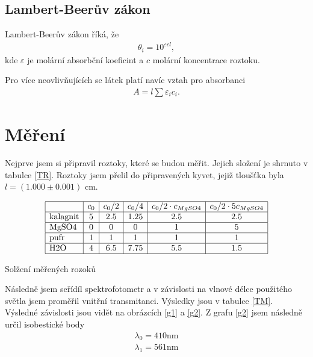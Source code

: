 \documentclass[a4paper,12pt]{article}
\begin{document}
\subsection{Lambert-Beerův zákon}
Lambert-Beerův zákon říká, že
\begin{eqnarray}
\theta_i=10^{\varepsilon cl},
\end{eqnarray}
kde $\varepsilon$ je molární absorbční koeficint a $c$ molární koncentrace roztoku.

Pro více neovlivňujících se látek platí navíc vztah pro absorbanci
\begin{eqnarray}
A=l\sum\varepsilon_ic_i.
\end{eqnarray}

\section{Měření}
Nejprve jsem si připravil roztoky, které se budou měřit. Jejich složení je shrnuto v tabulce \ref{TR}. Roztoky jsem přelil do připravených kyvet, jejiž tloušťka byla 
$l=(1.000 \pm 0.001)$ cm.

\begin{table}
$$
\begin{array}{|l|c|c|c|c|c|}
\hline
&   c_0&    c_0/2&    c_0/4&    c_0/2\cdot c_{MgSO4}& c_0/2\cdot 5c_{MgSO4} \\ \hline
\mbox{kalagnit}&    5&  2.5&  1.25& 2.5&    2.5 \\ \hline
\mbox{MgSO4}&   0&  0&  0&  1&  5 \\ \hline
\mbox{pufr}&    1&  1&  1&  1&  1 \\ \hline
\mbox{H2O}& 4&  6.5&    7.75&   5.5&    1.5 \\ \hline
\end{array}
$$
\caption{Solžení měřených rozoků}
\label{TR}
\end{table}

Následně jsem seřídíl spektrofotometr a v závislosti na vlnové délce použitého světla jsem proměřil vnitřní transmitanci. Výsledky jsou v tabulce \ref{TM}. Výsledné závislosti 
jsou vidět na obrázcích \ref{g1} a \ref{g2}. Z grafu \ref{g2} jsem následně určil isobestické body
\begin{eqnarray}
\lambda_0=410 \mbox{nm} \\
\lambda_1=561 \mbox{nm}
\end{eqnarray}
\end{document}
